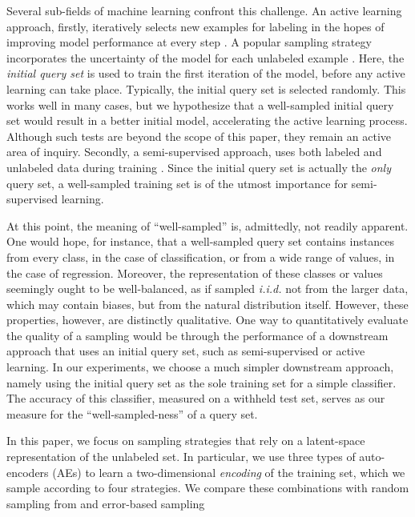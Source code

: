 \documentclass[a4paper]{article}
\begin{document}
Several sub-fields of machine learning confront this challenge. An active
learning approach, firstly, iteratively selects new examples for labeling in the
hopes of improving model performance at every step \cite{settles_active_2012}. A
popular sampling strategy incorporates the uncertainty of the model for each
unlabeled example \cite{settles_active_2012, lewis_sequential_1994}. Here, the
\emph{initial query set} is used to train the first iteration of the model,
before any active learning can take place. Typically, the initial query set is
selected randomly. This works well in many cases, but we hypothesize that a
well-sampled initial query set would result in a better initial model,
accelerating the active learning process. Although such tests are beyond the
scope of this paper, they remain an active area of inquiry. Secondly, a
semi-supervised approach, uses both labeled and unlabeled data during training
\cite{zhu_semi-supervised_2005}. Since the initial query set is actually the
\emph{only} query set, a well-sampled training set is of the utmost importance
for semi-supervised learning.

At this point, the meaning of ``well-sampled'' is, admittedly, not readily
apparent. One would hope, for instance, that a well-sampled query set contains
instances from every class, in the case of classification, or from a wide range
of values, in the case of regression. Moreover, the representation of these
classes or values seemingly ought to be well-balanced, as if sampled
\emph{i.i.d.} not from the larger data, which may contain biases, but from the
natural distribution itself. However, these properties, however, are distinctly
qualitative. One way to quantitatively evaluate the quality of a sampling would
be through the performance of a downstream approach that uses an initial query
set, such as semi-supervised or active learning. In our experiments, we choose a
much simpler downstream approach, namely using the initial query set as the sole
training set for a simple classifier. The accuracy of this classifier, measured
on a withheld test set, serves as our measure for the ``well-sampled-ness'' of a
query set.

In this paper, we focus on sampling strategies that rely on a latent-space
representation of the unlabeled set. In particular, we use three types of
auto-encoders (AEs) to learn a two-dimensional \emph{encoding} of the training
set, which we sample according to four strategies. We compare these combinations
with random sampling from  and error-based sampling
\end{document}
